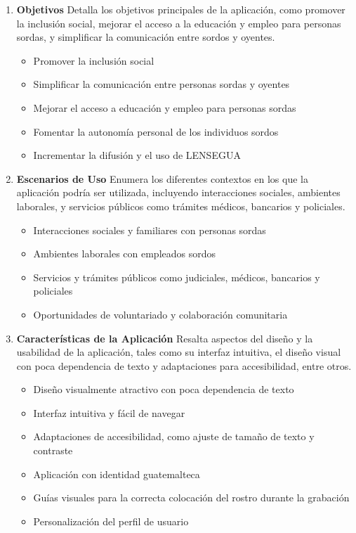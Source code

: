\begin{enumerate}
    \item \textbf{Objetivos} 
    Detalla los objetivos principales de la aplicación, como promover la inclusión social, mejorar el acceso a la educación y empleo para personas sordas, y simplificar la comunicación entre sordos y oyentes.
    \begin{itemize}
        \item Promover la inclusión social
        \item Simplificar la comunicación entre personas sordas y oyentes
        \item Mejorar el acceso a educación y empleo para personas sordas
        \item Fomentar la autonomía personal de los individuos sordos
        \item Incrementar la difusión y el uso de LENSEGUA
    \end{itemize}
    
    \item \textbf{Escenarios de Uso} 
    Enumera los diferentes contextos en los que la aplicación podría ser utilizada, incluyendo interacciones sociales, ambientes laborales, y servicios públicos como trámites médicos, bancarios y policiales.
    \begin{itemize}
        \item Interacciones sociales y familiares con personas sordas
        \item Ambientes laborales con empleados sordos
        \item Servicios y trámites públicos como judiciales, médicos, bancarios y policiales
        \item Oportunidades de voluntariado y colaboración comunitaria
    \end{itemize}
    
    \item \textbf{Características de la Aplicación} 
    Resalta aspectos del diseño y la usabilidad de la aplicación, tales como su interfaz intuitiva, el diseño visual con poca dependencia de texto y adaptaciones para accesibilidad, entre otros.
    \begin{itemize}
        \item Diseño visualmente atractivo con poca dependencia de texto
        \item Interfaz intuitiva y fácil de navegar
        \item Adaptaciones de accesibilidad, como ajuste de tamaño de texto y contraste
        \item Aplicación con identidad guatemalteca
        \item Guías visuales para la correcta colocación del rostro durante la grabación
        \item Personalización del perfil de usuario
    \end{itemize}
\end{enumerate}


